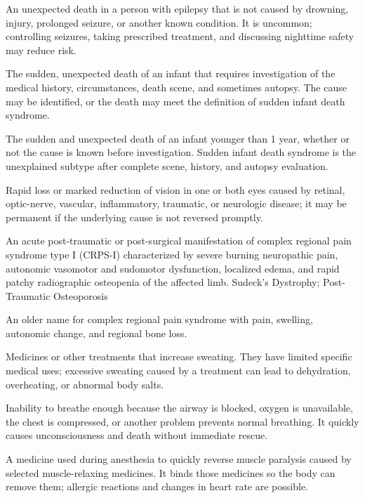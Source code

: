  An unexpected death in a person with epilepsy that is not caused by drowning, injury, prolonged seizure, or another known condition. It is uncommon; controlling seizures, taking prescribed treatment, and discussing nighttime safety may reduce risk.

 The sudden, unexpected death of an infant that requires investigation of the medical history, circumstances, death scene, and sometimes autopsy. The cause may be identified, or the death may meet the definition of sudden infant death syndrome.

 The sudden and unexpected death of an infant younger than 1 year, whether or not the
cause is known before investigation. Sudden infant death syndrome is the unexplained
subtype after complete scene, history, and autopsy evaluation.

 Rapid loss or marked reduction of vision in one or both eyes caused by retinal, optic-nerve, vascular, inflammatory, traumatic, or neurologic disease; it may be permanent if the underlying cause is not reversed promptly.

 An acute post-traumatic or post-surgical manifestation of complex regional pain syndrome type I (CRPS-I) characterized by severe burning neuropathic pain, autonomic vasomotor and sudomotor dysfunction, localized edema, and rapid patchy radiographic osteopenia of the affected limb.
\synonyms
Sudeck's Dystrophy; Post-Traumatic Osteoporosis

 An older name for complex regional pain syndrome with pain, swelling, autonomic change, and regional bone loss.

 Medicines or other treatments that increase sweating. They have limited specific medical uses; excessive sweating caused by a treatment can lead to dehydration, overheating, or abnormal body salts.

 Inability to breathe enough because the airway is blocked, oxygen is unavailable, the chest is compressed, or another problem prevents normal breathing. It quickly causes unconsciousness and death without immediate rescue.

 A medicine used during anesthesia to quickly reverse muscle paralysis caused by selected muscle-relaxing medicines. It binds those medicines so the body can remove them; allergic reactions and changes in heart rate are possible.

